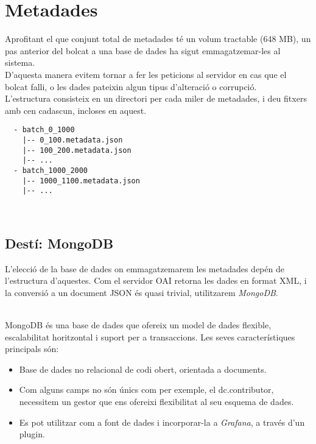 \section{Metadades}\label{sec:metadata-storing}

Aprofitant el que conjunt total de metadades té un volum tractable (648 MB), un pas anterior del bolcat a una base de dades ha sigut emmagatzemar-les al sistema. \\

\noindent
D’aquesta manera evitem tornar a fer les peticions al servidor en cas que el bolcat falli, o les dades pateixin algun tipus d’alteració o corrupció. \\

\noindent
L’estructura consisteix en un directori per cada miler de metadades, i deu fitxers amb cen cadascun, incloses en aquest.

\begin{verbatim}
  - batch_0_1000
    |-- 0_100.metadata.json
    |-- 100_200.metadata.json
    |-- ...
  - batch_1000_2000
    |-- 1000_1100.metadata.json
    |-- ...
\end{verbatim}

\noindent \\
\subsection{Destí: MongoDB}\label{subsec:metadata-db-mongodb}

L'elecció de la base de dades on emmagatzemarem les metadades depén de l'estructura d'aquestes.
Com el servidor \gls{OAI} retorna les dades en format \gls{XML}, i la conversió a un document \gls{JSON} és quasi trivial, utilitzarem \textit{MongoDB}.

\noindent \\
MongoDB és una base de dades que ofereix un model de dades flexible, escalabilitat horitzontal i suport per a transaccions.
Les seves característiques principals són:

\begin{itemize}
  \item Base de dades no relacional de codi obert, orientada a documents.
  \item Com alguns camps no són únics com per exemple, el dc.contributor, necessitem un gestor que ens ofereixi flexibilitat al seu esquema de dades.
  \item Es pot utilitzar com a font de dades i incorporar-la a \textit{Grafana}, a través d’un \gls{plugin}.
\end{itemize}

